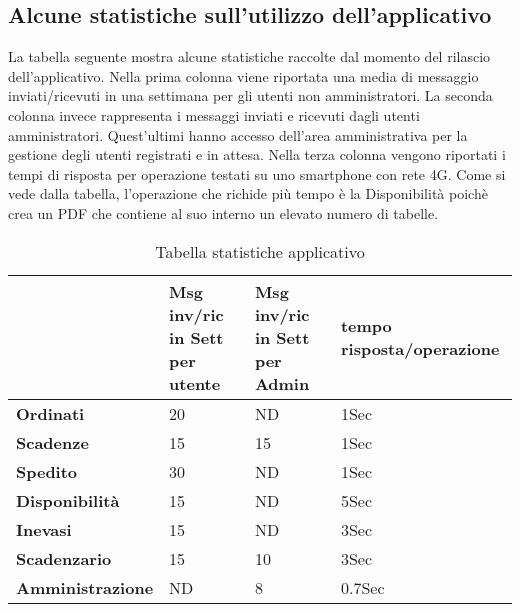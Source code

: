 \clearpage
 
 
\begin{table}
\subsection{Alcune statistiche sull'utilizzo dell'applicativo}

La tabella seguente mostra alcune statistiche raccolte dal momento del rilascio dell'applicativo. Nella prima colonna viene riportata una media di messaggio inviati/ricevuti in una settimana per gli utenti non amministratori. La seconda colonna invece rappresenta i messaggi inviati e ricevuti dagli utenti amministratori. Quest'ultimi hanno accesso dell'area amministrativa per la gestione degli utenti registrati e in attesa. Nella terza colonna vengono riportati i tempi di risposta per operazione testati su uno smartphone con rete 4G. Come si vede dalla tabella, l'operazione che richide più tempo è la Disponibilità poichè  crea un PDF che contiene al suo interno un elevato numero di tabelle. \\




\begin{tabular}{ |p{3cm}|p{3cm}|p{3cm}|p{3cm}| }

 \hline
   & \textbf{Msg inv/ric in Sett per utente}    &  \textbf{Msg inv/ric in Sett per Admin}  &  \textbf{tempo risposta/operazione}\\ 
 \hline
  \textbf{Ordinati} &  20   & ND & 1Sec\\

 \hline
  \textbf{Scadenze} &  15   & 15 & 1Sec\\
 \hline
   \textbf{Spedito} &  30   & ND & 1Sec\\
 \hline
    \textbf{Disponibilità} &  15   & ND & 5Sec\\
 \hline
   \textbf{Inevasi} &  15   & ND & 3Sec\\
 \hline
    \textbf{Scadenzario} &  15   & 10 & 3Sec\\
 \hline
    \textbf{Amministrazione} &  ND   & 8 & 0.7Sec\\
 \hline
\end{tabular}
\\
\caption{Tabella statistiche applicativo }
\end{table}




